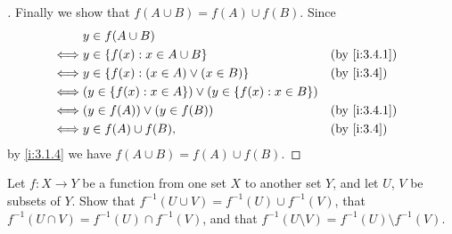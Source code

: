 \begin{proof}[]
  Finally we show that \(f(A \cup B) = f(A) \cup f(B)\).
  Since
  \begin{align*}
         & y \in f(A \cup B)                                                                      \\
    \iff & y \in \set{f(x) : x \in A \cup B}                                    &  & \by{i:3.4.1} \\
    \iff & y \in \set{f(x) : (x \in A) \lor (x \in B)}                          &  & \by{i:3.4}   \\
    \iff & \pa{y \in \set{f(x) : x \in A}} \lor \pa{y \in \set{f(x) : x \in B}}                   \\
    \iff & (y \in f(A)) \lor (y \in f(B))                                       &  & \by{i:3.4.1} \\
    \iff & y \in f(A) \cup f(B),                                                &  & \by{i:3.4}
  \end{align*}
  by \cref{i:3.1.4} we have \(f(A \cup B) = f(A) \cup f(B)\).
\end{proof}

\begin{ex}\label{i:ex:3.4.4}
  Let \(f : X \to Y\) be a function from one set \(X\) to another set \(Y\), and let \(U\), \(V\) be subsets of \(Y\). Show that \(f^{-1}(U \cup V) = f^{-1}(U) \cup f^{-1}(V)\), that
  \(f^{-1}(U \cap V) = f^{-1}(U) \cap f^{-1}(V)\), and that \(f^{-1}(U \setminus V) = f^{-1}(U) \setminus f^{-1}(V)\).
\end{ex}

